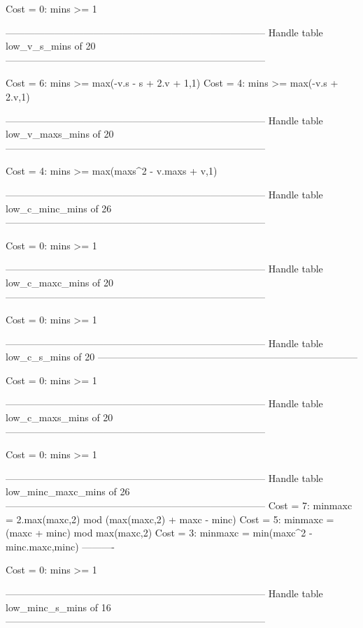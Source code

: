 Cost =  0:  mins >= 1

--------------------------------------------------------------------------------
Handle table low_v_s_mins of 20
--------------------------------------------------------------------------------

Cost =  6:  mins >= max(-v.s - s + 2.v + 1,1)
Cost =  4:  mins >= max(-v.s + 2.v,1)

--------------------------------------------------------------------------------
Handle table low_v_maxs_mins of 20
--------------------------------------------------------------------------------

Cost =  4:  mins >= max(maxs^2 - v.maxs + v,1)

--------------------------------------------------------------------------------
Handle table low_c_minc_mins of 26
--------------------------------------------------------------------------------

Cost =  0:  mins >= 1

--------------------------------------------------------------------------------
Handle table low_c_maxc_mins of 20
--------------------------------------------------------------------------------

Cost =  0:  mins >= 1

--------------------------------------------------------------------------------
Handle table low_c_s_mins of 20
--------------------------------------------------------------------------------

Cost =  0:  mins >= 1

--------------------------------------------------------------------------------
Handle table low_c_maxs_mins of 20
--------------------------------------------------------------------------------

Cost =  0:  mins >= 1

--------------------------------------------------------------------------------
Handle table low_minc_maxc_mins of 26
--------------------------------------------------------------------------------
Cost =  7:  minmaxc = 2.max(maxc,2) mod (max(maxc,2) + maxc - minc)
Cost =  5:  minmaxc = (maxc + minc) mod max(maxc,2)
Cost =  3:  minmaxc = min(maxc^2 - minc.maxc,minc)
----------

Cost =  0:  mins >= 1

--------------------------------------------------------------------------------
Handle table low_minc_s_mins of 16
--------------------------------------------------------------------------------

